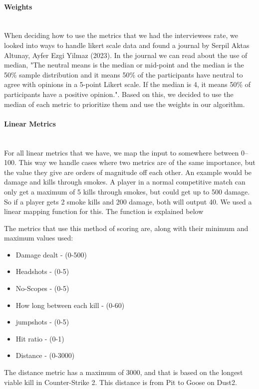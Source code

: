 \paragraph{Weights}\mbox{}\\
When deciding how to use the metrics that we had the interviewees rate, we looked into ways to handle likert scale data and found a journal \cite{AltunaySerpil} by Serpil Aktas Altunay, Ayfer Ezgi Yilmaz (2023). In the journal we can read about the use of median, "The neutral means is the median or mid-point and the median is the 50\% sample distribution and it means 50\% of the participants have neutral to agree with opinions in a 5-point Likert scale. If the median is 4, it means 50\% of
participants have a positive opinion.". Based on this, we decided to use the median of each metric to prioritize them and use the weights in our algorithm.

\paragraph{Linear Metrics}\mbox{}\\
For all linear metrics that we have, we map the input to somewhere between 0–100. This way we handle cases where two metrics are of the same importance, but the value they give are orders of magnitude off each other. An example would be damage and kills through smokes. A player in a normal competitive match can only get a maximum of 5 kills through \gls{smokes}, but could get up to 500 damage. So if a player gets 2 smoke kills and 200 damage, both will output 40. We used a linear mapping function for this. The function is explained below 

The metrics that use this method of scoring are, along with their minimum and maximum values used:
\begin{itemize}
    \item Damage dealt - (0-500)
    \item Headshots - (0-5)
    \item No-Scopes - (0-5)
    \item How long between each kill - (0-60)
    \item \Gls{jumpshot}s - (0-5)
    \item Hit ratio - (0-1)
    \item Distance - (0-3000)
\end{itemize}

The distance metric has a maximum of 3000, and that is based on the longest viable kill in Counter-Strike 2. This distance is from Pit to Goose on Dust2.


